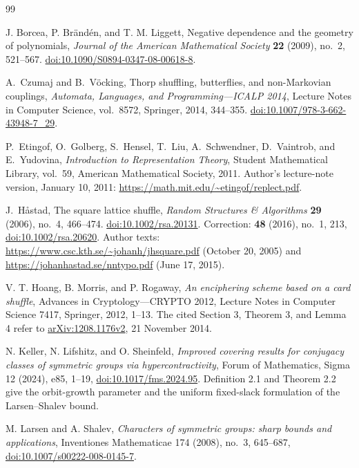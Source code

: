 \begin{thebibliography}{99}

J. Borcea, P. Br\"and\'en, and T. M. Liggett,
Negative dependence and the geometry of polynomials,
\emph{Journal of the American Mathematical Society} \textbf{22} (2009), no.~2, 521--567.
\href{https://doi.org/10.1090/S0894-0347-08-00618-8}{doi:10.1090/S0894-0347-08-00618-8}.

A.~Czumaj and B.~V\"ocking,
Thorp shuffling, butterflies, and non-Markovian couplings,
\emph{Automata, Languages, and Programming---ICALP 2014},
Lecture Notes in Computer Science, vol.~8572, Springer, 2014,
344--355.
\href{https://doi.org/10.1007/978-3-662-43948-7_29}
{doi:10.1007/978-3-662-43948-7\_29}.

P.~Etingof, O.~Golberg, S.~Hensel, T.~Liu, A.~Schwendner,
D.~Vaintrob, and E.~Yudovina,
\emph{Introduction to Representation Theory},
Student Mathematical Library, vol.~59, American Mathematical Society,
2011.
Author's lecture-note version, January 10, 2011:
\url{https://math.mit.edu/~etingof/replect.pdf}.

J.~H\aa stad,
The square lattice shuffle,
\emph{Random Structures \& Algorithms} \textbf{29} (2006), no.~4,
466--474.
\href{https://doi.org/10.1002/rsa.20131}{doi:10.1002/rsa.20131}.
Correction: \textbf{48} (2016), no.~1, 213,
\href{https://doi.org/10.1002/rsa.20620}{doi:10.1002/rsa.20620}.
Author texts:
\url{https://www.csc.kth.se/~johanh/jhsquare.pdf} (October 20, 2005)
and \url{https://johanhastad.se/nntypo.pdf} (June 17, 2015).

V. T. Hoang, B. Morris, and P. Rogaway,
\emph{An enciphering scheme based on a card shuffle},
Advances in Cryptology---CRYPTO 2012,
Lecture Notes in Computer Science 7417, Springer, 2012, 1--13.
The cited Section 3, Theorem 3, and Lemma 4 refer to
\href{https://arxiv.org/abs/1208.1176v2}{arXiv:1208.1176v2},
21 November 2014.

N. Keller, N. Lifshitz, and O. Sheinfeld,
\emph{Improved covering results for conjugacy classes of symmetric groups
via hypercontractivity},
Forum of Mathematics, Sigma 12 (2024), e85, 1--19,
\href{https://doi.org/10.1017/fms.2024.95}{doi:10.1017/fms.2024.95}.
Definition 2.1 and Theorem 2.2 give the orbit-growth parameter and
the uniform fixed-slack formulation of the Larsen--Shalev bound.

M. Larsen and A. Shalev,
\emph{Characters of symmetric groups: sharp bounds and applications},
Inventiones Mathematicae 174 (2008), no.~3, 645--687,
\href{https://doi.org/10.1007/s00222-008-0145-7}{doi:10.1007/s00222-008-0145-7}.


\end{thebibliography}

